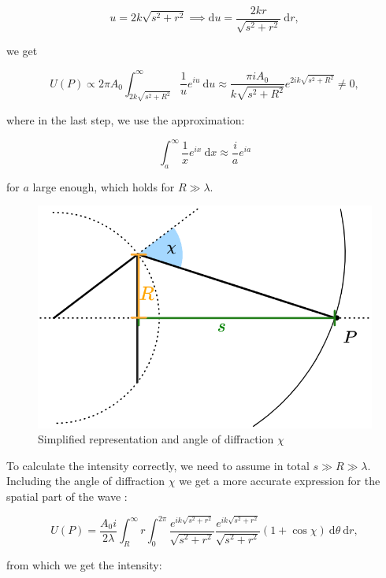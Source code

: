 \documentclass[11pt,a4paper]{article}
\begin{document}
$$u = 2k\sqrt{s^{2} + r^{2}} \implies \mathrm{d}u = \frac{2kr}{\sqrt{s^{2} + r^{2}}} \ \mathrm{d}r,$$

we get

$$U(P) \propto 2\pi A_{0} \int_{2k\sqrt{s^{2} + R^{2}}}^{\infty} \frac{1}{u} e^{iu} \ \mathrm{d}u \approx \frac{\pi iA_{0}}{k\sqrt{s^{2} + R^{2}}} e^{2ik\sqrt{s^{2} + R^{2}}} \neq 0, $$

where in the last step, we use the approximation:

$$\int_{a}^{\infty} \frac{1}{x} e^{ix} \ \mathrm{d}x \approx \frac{i}{a} e^{ia}$$

for ${ a }$ large enough, which holds for ${ R \gg \lambda }$.

\begin{figure}
    \centering
    \includegraphics[width=1\linewidth]{1 - Arago Spot/Images/diffraction-angle.png}
    \caption{Simplified representation and angle of diffraction $\chi$}
    \label{fig:enter-label}
\end{figure}



To calculate the intensity correctly, we need to assume in total ${ s \gg R \gg \lambda }$.
Including the angle of diffraction ${ \chi }$ we get a more accurate expression for the spatial part of the wave \cite{KTHReport}:

$$U(P) = \frac{A_{0}i}{2\lambda} \int_{R}^{\infty} r \int_{0}^{2\pi} \frac{e^{ik\sqrt{s^{2} + r^{2}}}}{\sqrt{s^{2} + r^{2}}} \frac{e^{ik\sqrt{s^{2} + r^{2}}}}{\sqrt{s^{2} + r^{2}}} (1 + \cos \chi) \ \mathrm{d}\theta \ \mathrm{d}r,$$

from which we get the intensity:
\end{document}

